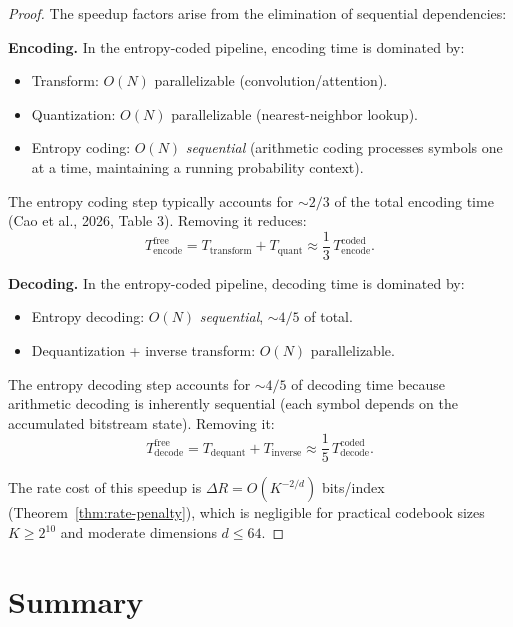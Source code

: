 \documentclass[11pt,a4paper]{article}
\theoremstyle{definition}
\theoremstyle{remark}
\begin{document}
\begin{proof}
The speedup factors arise from the elimination of sequential dependencies:

\textbf{Encoding.} In the entropy-coded pipeline, encoding time is dominated by:
\begin{itemize}[nosep]
  \item Transform: $O(N)$ parallelizable (convolution/attention).
  \item Quantization: $O(N)$ parallelizable (nearest-neighbor lookup).
  \item Entropy coding: $O(N)$ \emph{sequential} (arithmetic coding processes
        symbols one at a time, maintaining a running probability context).
\end{itemize}
The entropy coding step typically accounts for $\sim 2/3$ of the total
encoding time (Cao et al., 2026, Table 3). Removing it reduces:
\[
T_{\mathrm{encode}}^{\mathrm{free}}
= T_{\mathrm{transform}} + T_{\mathrm{quant}}
\approx \frac{1}{3}\, T_{\mathrm{encode}}^{\mathrm{coded}}.
\]

\textbf{Decoding.} In the entropy-coded pipeline, decoding time is dominated by:
\begin{itemize}[nosep]
  \item Entropy decoding: $O(N)$ \emph{sequential}, $\sim 4/5$ of total.
  \item Dequantization + inverse transform: $O(N)$ parallelizable.
\end{itemize}
The entropy decoding step accounts for $\sim 4/5$ of decoding time because
arithmetic decoding is inherently sequential (each symbol depends on the
accumulated bitstream state). Removing it:
\[
T_{\mathrm{decode}}^{\mathrm{free}}
= T_{\mathrm{dequant}} + T_{\mathrm{inverse}}
\approx \frac{1}{5}\, T_{\mathrm{decode}}^{\mathrm{coded}}.
\]

The rate cost of this speedup is $\Delta R = O(K^{-2/d})$ bits/index
(Theorem~\ref{thm:rate-penalty}), which is negligible for practical
codebook sizes $K \geq 2^{10}$ and moderate dimensions $d \leq 64$.
\end{proof}

\section{Summary}
\end{document}

